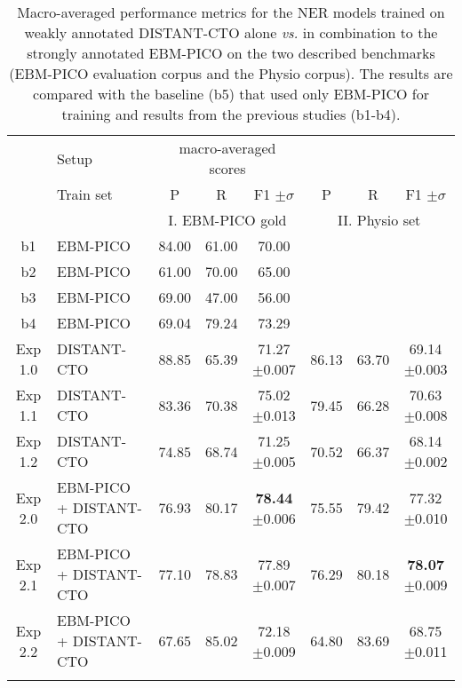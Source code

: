 \documentclass[letterpaper]{article} %
\begin{document}
%
%
%
\setlength{\tabcolsep}{4pt} %
\renewcommand{\arraystretch}{1.0}
\begin{table*}[hbt!]
    \centering
    \begin{tabular}{clccc|ccc}
        \Xhline{1pt}
         & Setup & \multicolumn{3}{c}{macro-averaged scores} \\
        \Xhline{1pt}
         & Train set & P & R & F1 $\pm\sigma$ & P & R & F1 $\pm\sigma$\\
        \hline 
        &  & \multicolumn{3}{c}{I. EBM-PICO gold} & \multicolumn{3}{c}{II. Physio set}  \\
        \hline
        b1 & EBM-PICO & 84.00 & 61.00 & 70.00 &  &  &\\
        b2 & EBM-PICO & 61.00 & 70.00 & 65.00 &  &  &\\
        b3 & EBM-PICO & 69.00 & 47.00 & 56.00 &  &  &\\
        b4 & EBM-PICO & 69.04 & 79.24 & 73.29 &  &  &\\
        \hline
        \hline 
        Exp 1.0 & DISTANT-CTO& 88.85 & 65.39 & 71.27 $\pm$0.007 & 86.13 & 63.70 & 69.14 $\pm$0.003\\
        Exp 1.1 & DISTANT-CTO & 83.36 & 70.38 & 75.02 $\pm$0.013 & 79.45 & 66.28 & 70.63 $\pm$0.008\\
        Exp 1.2 & DISTANT-CTO & 74.85 & 68.74 & 71.25 $\pm$0.005 & 70.52 & 66.37 & 68.14 $\pm$0.002 \\

        Exp 2.0 & EBM-PICO + DISTANT-CTO & 76.93  & 80.17  & \textbf{78.44 } $\pm$0.006 & 75.55  & 79.42 & 77.32 $\pm$0.010\\
        Exp 2.1 & EBM-PICO + DISTANT-CTO & 77.10 & 78.83 & 77.89 $\pm$0.007 & 76.29 & 80.18 & \textbf{78.07} $\pm$0.009\\
        Exp 2.2 & EBM-PICO + DISTANT-CTO & 67.65 & 85.02 & 72.18 $\pm$0.009  & 64.80 & 83.69 & 68.75 $\pm$0.011 \\
        \Xhline{1pt}
    \end{tabular}
    \caption{Macro-averaged performance metrics for the NER models trained on weakly annotated DISTANT-CTO alone \textit{vs.} in combination to the strongly annotated EBM-PICO on the two described benchmarks (EBM-PICO evaluation corpus and the Physio corpus). The results are compared with the baseline (b5) that used only EBM-PICO for training and results from the previous studies (b1-b4).} %
    \label{tab:results_modeltraining}
\end{table*}
%
\end{document}
